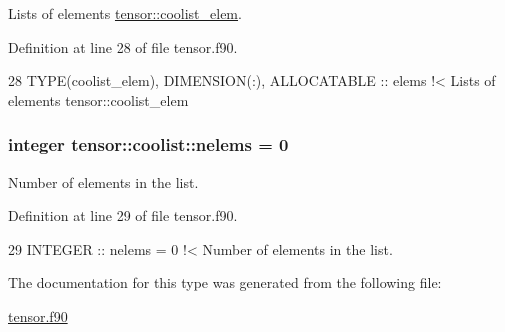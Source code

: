 Lists of elements \hyperlink{structtensor_1_1coolist__elem}{tensor\+::coolist\+\_\+elem}. 



Definition at line 28 of file tensor.\+f90.


\begin{DoxyCode}
28      \textcolor{keywordtype}{TYPE}(coolist\_elem), \textcolor{keywordtype}{DIMENSION(:)}, \textcolor{keywordtype}{ALLOCATABLE} :: elems\textcolor{comment}{ !< Lists of elements tensor::coolist\_elem}
\end{DoxyCode}
\subsubsection[{\texorpdfstring{nelems}{nelems}}]{\setlength{\rightskip}{0pt plus 5cm}integer tensor\+::coolist\+::nelems = 0}\hypertarget{structtensor_1_1coolist_aac72e7727f1b161da2b9d54e25eb7aae}{}\label{structtensor_1_1coolist_aac72e7727f1b161da2b9d54e25eb7aae}


Number of elements in the list. 



Definition at line 29 of file tensor.\+f90.


\begin{DoxyCode}
29      \textcolor{keywordtype}{INTEGER} :: nelems = 0\textcolor{comment}{ !< Number of elements in the list.}
\end{DoxyCode}


The documentation for this type was generated from the following file\+:\begin{DoxyCompactItemize}
\item 
\hyperlink{tensor_8f90}{tensor.\+f90}\end{DoxyCompactItemize}
